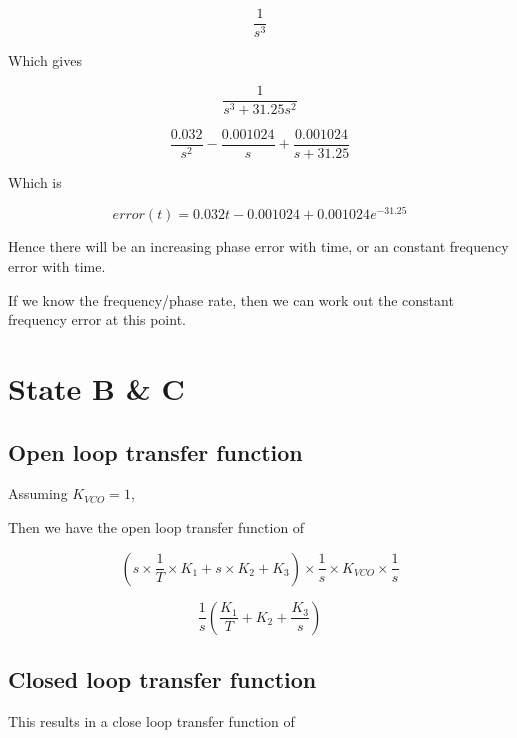 \begin{equation}
\frac{1}{s^3}
\end{equation}

Which gives 

\begin{equation}
\frac{1}{s^3+31.25s^2}
\end{equation}

\begin{equation}
\frac{0.032}{s^2} - \frac{0.001024}{s} + \frac{0.001024}{s+31.25}
\end{equation}

Which is 

\begin{equation}
error(t) =  0.032t - 0.001024 + 0.001024 e^{-31.25}
\end{equation}

Hence there will be an increasing phase error with time, or an constant frequency error with time. 

If we know the frequency/phase rate, then we can work out the constant frequency error at this point.

\clearpage

\section{State B \& C}


\subsection{Open loop transfer function}

Assuming $K_{VCO} = 1$, 

Then we have the open loop transfer function of 

\begin{equation}
(s \times \frac{1}{T} \times K_1 + s \times K_2 +K_3 ) \times \frac{1}{s} \times K_{VCO} \times \frac{1}{s}
\end{equation}


\begin{equation}
\frac{1}{s} (\frac{K_1}{T} + K_2 +  \frac{K_3}{s})
\end{equation}

 
\subsection{Closed loop transfer function}
This results in a close loop transfer function of 

